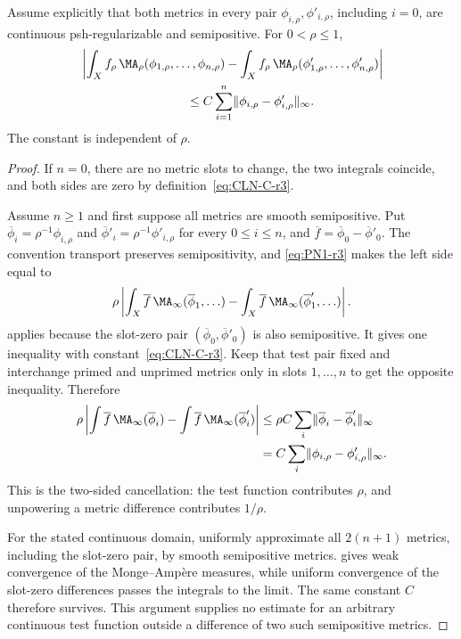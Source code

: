\begin{lemma}
\label{lem:CLN-r3}
Assume explicitly that both metrics in every pair
$\phi_{i,\rho},\phi'_{i,\rho}$, including $i=0$, are continuous
psh-regularizable and semipositive.  For $0<\rho\leq1$,
\begin{align}
 &\left|\int_Xf_\rho\,
 \MA_\rho(\phi_{1,\rho},\ldots,\phi_{n,\rho})
 -\int_Xf_\rho\,
 \MA_\rho(\phi'_{1,\rho},\ldots,\phi'_{n,\rho})\right|\notag\\
 &\hspace{30mm}\leq
 C\sum_{i=1}^n
 \norm{\phi_{i,\rho}-\phi'_{i,\rho}}_\infty.
\label{eq:CLN-r3}
\end{align}
The constant is independent of $\rho$.
\end{lemma}

\begin{proof}
If $n=0$, there are no metric slots to change, the two integrals coincide,
and both sides are zero by definition~\eqref{eq:CLN-C-r3}.

Assume $n\geq1$ and first suppose all metrics are smooth semipositive.
Put $\overline\phi_i=\rho^{-1}\phi_{i,\rho}$ and
$\overline\phi'_i=\rho^{-1}\phi'_{i,\rho}$ for every $0\leq i\leq n$,
and $\overline f=\overline\phi_0-\overline\phi'_0$.
The convention transport preserves semipositivity, and
\eqref{eq:PN1-r3} makes the left side equal to
\[
 \rho\left|\int_X\overline f\,
 \MA_\infty(\overline\phi_1,\ldots)
 -\int_X\overline f\,
 \MA_\infty(\overline\phi'_1,\ldots)\right|.
\]
\cite[Lemma~8.6]{BE21} applies because the slot-zero pair
$(\overline\phi_0,\overline\phi'_0)$ is also semipositive.  It gives one
inequality with constant~\eqref{eq:CLN-C-r3}.  Keep that test pair fixed and
interchange primed and unprimed metrics only in slots $1,\ldots,n$ to get
the opposite inequality.  Therefore
\begin{align*}
 \rho\left|\int\overline f\,\MA_\infty(\overline\phi_i)
 -\int\overline f\,\MA_\infty(\overline\phi'_i)\right|
 &\leq\rho C\sum_i
 \norm{\overline\phi_i-\overline\phi'_i}_\infty\\
 &=C\sum_i
 \norm{\phi_{i,\rho}-\phi'_{i,\rho}}_\infty.
\end{align*}
This is the two-sided cancellation: the test function contributes $\rho$,
and unpowering a metric difference contributes $1/\rho$.

For the stated continuous domain, uniformly approximate all
$2(n+1)$ metrics, including the slot-zero pair, by smooth semipositive
metrics.  \cite[Theorem~8.4]{BE21} gives weak convergence of the
Monge--Amp\`ere measures, while uniform convergence of the slot-zero
differences passes the integrals to the limit.  The same constant $C$
therefore survives.  This argument supplies no estimate for an arbitrary
continuous test function outside a difference of two such semipositive
metrics.
\end{proof}

